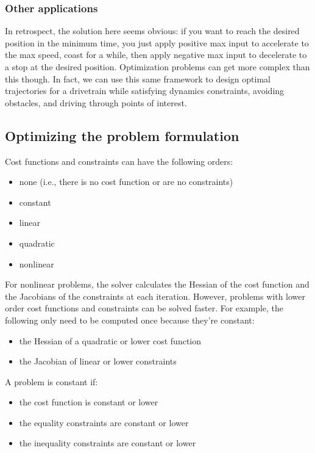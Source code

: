 \subsubsection{Other applications}

In retrospect, the solution here seems obvious: if you want to reach the desired
position in the minimum time, you just apply positive max input to accelerate to
the max speed, coast for a while, then apply negative max input to decelerate to
a stop at the desired position. Optimization problems can get more complex than
this though. In fact, we can use this same framework to design optimal
trajectories for a drivetrain while satisfying dynamics constraints, avoiding
obstacles, and driving through points of interest.

\subsection{Optimizing the problem formulation}

Cost functions and constraints can have the following orders:
\begin{itemize}
  \item none (i.e., there is no cost function or are no constraints)
  \item constant
  \item linear
  \item quadratic
  \item nonlinear
\end{itemize}

For nonlinear problems, the solver calculates the Hessian of the cost function
and the Jacobians of the constraints at each iteration. However, problems with
lower order cost functions and constraints can be solved faster. For example,
the following only need to be computed once because they're constant:
\begin{itemize}
  \item the Hessian of a quadratic or lower cost function
  \item the Jacobian of linear or lower constraints
\end{itemize}

A problem is constant if:
\begin{itemize}
  \item the cost function is constant or lower
  \item the equality constraints are constant or lower
  \item the inequality constraints are constant or lower
\end{itemize}

